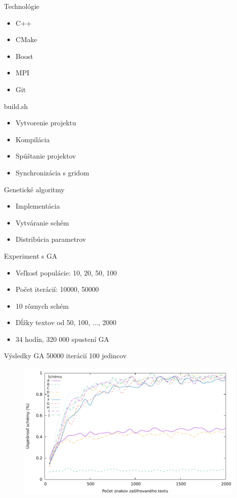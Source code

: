 \documentclass{beamer}
\begin{document}
\begin{frame}{Technológie}
  \begin{itemize}
  \item C++
  \item CMake
  \item Boost
  \item MPI
  \item Git
  \end{itemize}
\end{frame}

\begin{frame}{build.sh}
  \begin{itemize}
  \item Vytvorenie projektu
  \item Kompilácia
  \item Spúštanie projektov
  \item Synchronizácia s gridom
  \end{itemize}
\end{frame}

\begin{frame}{Genetické algoritmy}
  \begin{itemize}
  \item Implementácia
  \item Vytváranie schém
  \item Distribúcia parametrov
  \end{itemize}
\end{frame}

\begin{frame}{Experiment s GA}
  \begin{itemize}
  \item Veľkosť populácie: 10, 20, 50, 100
  \item Počet iterácií: 10000, 50000
  \item 10 rôznych schém
  \item Dĺžky textov od 50, 100, ..., 2000
  \item 34 hodín, 320 000 spustení GA
  \end{itemize}
\end{frame}

\begin{frame}{Výsledky GA 50000 iterácií 100 jedincov}
  \begin{figure}
    \includegraphics[scale=0.75]{img/GA_50000_100.pdf}
  \end{figure}
\end{frame}
\end{document}
